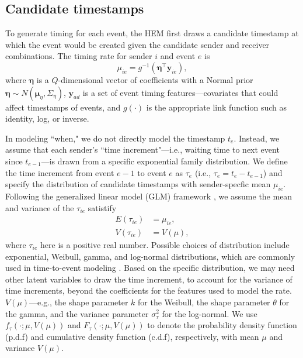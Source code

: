 \documentclass[ba]{imsart}
\numberwithin{equation}{section}
\theoremstyle{plain}
\begin{document}
	
	\subsection{Candidate timestamps}\label{subsec:Time}
	To generate timing for each event, the HEM first draws a candidate timestamp at which the event would be created given the candidate sender and receiver combinations. The timing rate for sender $i$ and event $e$ is
	\begin{equation}
		\mu_{ie} = g^{-1}(\boldsymbol{\eta}^\top \boldsymbol{y}_{ie}),
	\end{equation}
	where $\boldsymbol{\eta}$ is a $Q$-dimensional vector of coefficients with a Normal prior $\boldsymbol{\eta} \sim N(\boldsymbol{\mu}_\eta,\Sigma_\eta)$, $\boldsymbol{y}_{ad}$ is a set of event timing features---covariates that could affect timestamps of events, and $g(\cdot)$ is the appropriate link function such as identity, log, or inverse. 
	
	In modeling ``when," we do not directly model the timestamp $t_e$. Instead, we assume that each sender's ``time increment"---i.e., waiting time to next event since $t_{e-1}$---is drawn from a specific exponential family distribution. We define the time increment from event $e-1$ to event $e$ as $\tau_{e}$ (i.e., $\tau_{e}= t_e-t_{e-1}$) and specify the distribution of candidate timestamps with sender-specfic mean $\mu_{ie}$. Following the generalized linear model (GLM) framework \citep{nelder1972generalized}, we assume the mean and variance of the $\tau_{ie}$ satistify~
	\begin{equation}
		\begin{aligned}
			E(\tau_{ie}) &= \mu_{ie},\\
			V(\tau_{ie}) &= V(\mu),
		\end{aligned}
	\end{equation}
	where $\tau_{ie}$ here is a positive real number. Possible choices of distribution include exponential, Weibull, gamma, and log-normal distributions, which are commonly used in time-to-event modeling \citep{rao2000applied,rizopoulos2012joint}. Based on the specific distribution, we may need other latent variables to draw the time increment, to account for the variance of time increments, beyond the coefficients for the features used to model the rate. $V(\mu)$---e.g., the shape parameter $k$ for the Weibull, the shape parameter $\theta$ for the gamma, and the variance parameter $\sigma_\tau^2$ for the log-normal. We use $f_\tau(\cdot; \mu, V(\mu))$ and $F_\tau(\cdot; \mu, V(\mu))$ to denote the probability density function (p.d.f) and cumulative density function (c.d.f), respectively, with mean $\mu$ and variance $V(\mu)$.~
\end{document}
